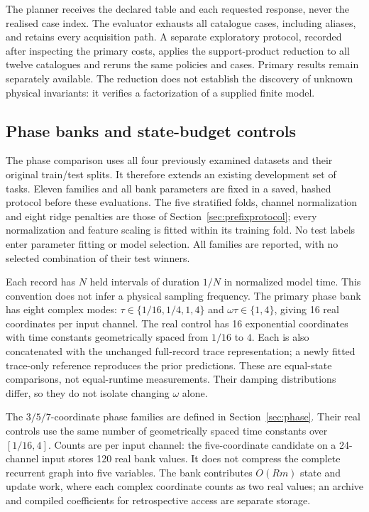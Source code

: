 \documentclass[11pt,a4paper]{article}
\theoremstyle{definition}\newtheorem{definition}[theorem]{Definition}
\begin{document}
The planner receives the declared table and each requested response, never the realised case index. The evaluator exhausts all catalogue cases, including aliases, and retains every acquisition path. A separate exploratory protocol, recorded after inspecting the primary costs, applies the support-product reduction to all twelve catalogues and reruns the same policies and cases. Primary results remain separately available. The reduction does not establish the discovery of unknown physical invariants: it verifies a factorization of a supplied finite model.

\subsection{Phase banks and state-budget controls}\label{sec:phaseprotocol}
The phase comparison uses all four previously examined datasets and their original train/test splits. It therefore extends an existing development set of tasks. Eleven families and all bank parameters are fixed in a saved, hashed protocol before these evaluations. The five stratified folds, channel normalization and eight ridge penalties are those of Section~\ref{sec:prefixprotocol}; every normalization and feature scaling is fitted within its training fold. No test labels enter parameter fitting or model selection. All families are reported, with no selected combination of their test winners.

Each record has $N$ held intervals of duration $1/N$ in normalized model time. This convention does not infer a physical sampling frequency. The primary phase bank has eight complex modes: $\tau\in\{1/16,1/4,1,4\}$ and $\omega\tau\in\{1,4\}$, giving 16 real coordinates per input channel. The real control has 16 exponential coordinates with time constants geometrically spaced from $1/16$ to $4$. Each is also concatenated with the unchanged full-record trace representation; a newly fitted trace-only reference reproduces the prior predictions. These are equal-state comparisons, not equal-runtime measurements. Their damping distributions differ, so they do not isolate changing $\omega$ alone.

The $3/5/7$-coordinate phase families are defined in Section~\ref{sec:phase}. Their real controls use the same number of geometrically spaced time constants over $[1/16,4]$. Counts are per input channel: the five-coordinate candidate on a 24-channel input stores 120 real bank values. It does not compress the complete recurrent graph into five variables. The bank contributes $O(Rm)$ state and update work, where each complex coordinate counts as two real values; an archive and compiled coefficients for retrospective access are separate storage.
\end{document}

